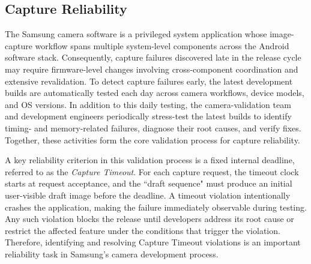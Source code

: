 \subsection{Capture Reliability}
\label{sec:release-process}
The Samsung camera software is a privileged system application whose image-capture workflow spans multiple system-level components across the Android software stack.
Consequently, capture failures discovered late in the release cycle may require firmware-level changes involving cross-component coordination and extensive revalidation.
To detect capture failures early, the latest development builds are automatically tested each day across camera workflows, device models, and OS versions.
In addition to this daily testing, the camera-validation team and development engineers periodically stress-test the latest builds to identify timing- and memory-related failures, diagnose their root causes, and verify fixes.
Together, these activities form the core validation process for capture reliability.

A key reliability criterion in this validation process is a fixed internal deadline, referred to as the \emph{Capture Timeout}.
For each capture request, the timeout clock starts at request acceptance, and the ``draft sequence" must produce an initial user-visible draft image before the deadline.
A timeout violation intentionally crashes the application, making the failure immediately observable during testing.
Any such violation blocks the release until developers address its root cause or restrict the affected feature under the conditions that trigger the violation.
Therefore, identifying and resolving Capture Timeout violations is an important reliability task in Samsung's camera development process.
\fi